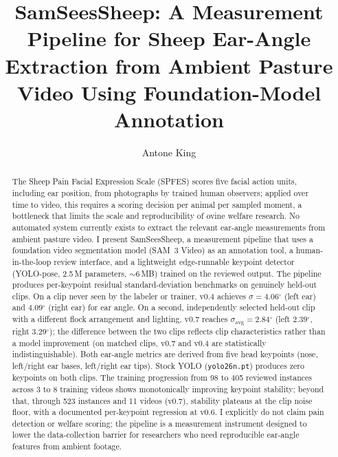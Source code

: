 \documentclass[11pt]{article}
\title{SamSeesSheep: A Measurement Pipeline for Sheep Ear-Angle
Extraction from Ambient Pasture Video Using Foundation-Model Annotation}
\author[1]{Antone King}
\affil[1]{Independent Researcher, Middletown, Delaware, USA \\ \texttt{toneking972@gmail.com}}
\date{}
\newcommand{\dgr}{\ensuremath{^{\circ}}}
\newcommand{\sigavg}{\ensuremath{\sigma_{\text{avg}}}}
\begin{document}
\maketitle

\begin{abstract}
The Sheep Pain Facial Expression Scale (SPFES) \citep{mclennan2016,mclennan2019}
scores five facial action units, including ear position, from photographs by
trained human observers; applied over time to video, this requires a scoring
decision per animal per sampled moment, a bottleneck that limits the scale and
reproducibility of ovine welfare research. No
automated system currently exists to extract the relevant ear-angle
measurements from ambient pasture video. I present SamSeesSheep, a measurement
pipeline that uses a foundation video segmentation model (SAM~3 Video) as an
annotation tool, a human-in-the-loop review interface, and a lightweight
edge-runnable keypoint detector (YOLO-pose, 2.5\,M parameters, ${\sim}6$\,MB)
trained on the reviewed output. The pipeline produces per-keypoint residual
standard-deviation benchmarks on genuinely held-out clips. On a clip never seen
by the labeler or trainer, v0.4 achieves $\sigma = 4.06\dgr$ (left ear) and
$4.09\dgr$ (right ear) for ear angle. On a second, independently selected
held-out clip with a different flock arrangement and lighting, v0.7 reaches
$\sigavg = 2.84\dgr$ (left $2.39\dgr$, right $3.29\dgr$); the difference between
the two clips reflects clip characteristics rather than a model improvement
(on matched clips, v0.7 and v0.4 are statistically indistinguishable). Both
ear-angle metrics are derived from five head keypoints (nose, left/right ear
bases, left/right ear tips). Stock YOLO (\texttt{yolo26n.pt}) produces zero
keypoints on both clips. The training progression from 98 to 405 reviewed
instances across 3 to 8 training videos shows monotonically improving keypoint
stability; beyond that, through 523 instances and 11 videos (v0.7), stability
plateaus at the clip noise floor, with a documented per-keypoint regression at
v0.6. I explicitly do not claim pain detection or welfare scoring; the pipeline
is a measurement instrument designed to lower the data-collection barrier for
researchers who need reproducible ear-angle features from ambient footage.
\end{abstract}
\end{document}
